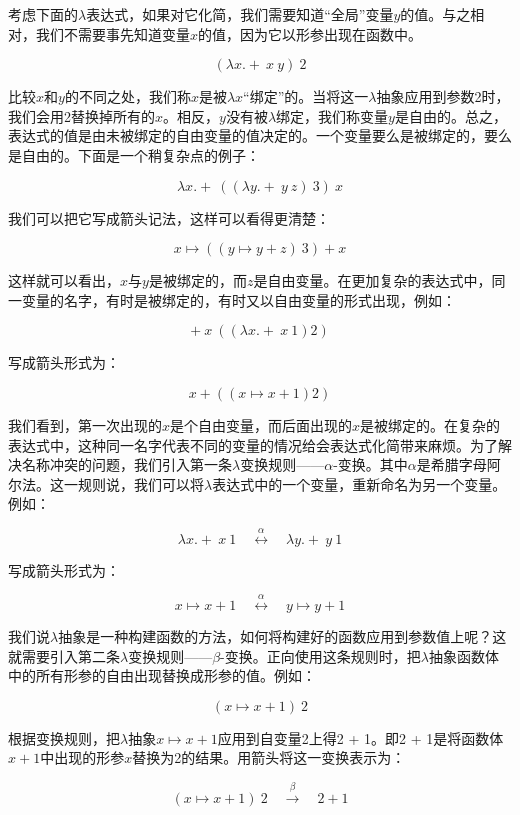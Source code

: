 \documentclass[UTF8]{article}
\begin{document}
考虑下面的$\lambda$表达式，如果对它化简，我们需要知道“全局”变量$y$的值。与之相对，我们不需要事先知道变量$x$的值，因为它以形参出现在函数中。

\[
(\lambda x . +\ x\ y)\ 2
\]

比较$x$和$y$的不同之处，我们称$x$是被$\lambda x$“绑定”的。当将这一$\lambda$抽象应用到参数2时，我们会用2替换掉所有的$x$。相反，$y$没有被$\lambda$绑定，我们称变量$y$是自由的。总之，表达式的值是由未被绑定的自由变量的值决定的。一个变量要么是被绑定的，要么是自由的。下面是一个稍复杂点的例子：

\[
\lambda x . +\ ((\lambda y . +\ y\ z)\ 3)\ x
\]

我们可以把它写成箭头记法，这样可以看得更清楚：

\[
x \mapsto ((y \mapsto y + z)\ 3) + x
\]

这样就可以看出，$x$与$y$是被绑定的，而$z$是自由变量。在更加复杂的表达式中，同一变量的名字，有时是被绑定的，有时又以自由变量的形式出现，例如：

\[
+\ x\ ((\lambda x . +\ x\ 1) 2)
\]

写成箭头形式为：

\[
x + ((x \mapsto x + 1) 2)
\]

我们看到，第一次出现的$x$是个自由变量，而后面出现的$x$是被绑定的。在复杂的表达式中，这种同一名字代表不同的变量的情况给会表达式化简带来麻烦。为了解决名称冲突的问题，我们引入第一条$\lambda$变换规则——$\alpha$-变换。其中$\alpha$是希腊字母阿尔法。这一规则说，我们可以将$\lambda$表达式中的一个变量，重新命名为另一个变量。例如：

\[
\lambda x . +\ x\ 1 \quad \overset{\alpha}{\longleftrightarrow} \quad \lambda y . +\ y\ 1
\]


写成箭头形式为：

\[
x \mapsto x + 1 \quad \overset{\alpha}{\longleftrightarrow} \quad y \mapsto y + 1
\]

我们说$\lambda$抽象是一种构建函数的方法，如何将构建好的函数应用到参数值上呢？这就需要引入第二条$\lambda$变换规则——$\beta$-变换。正向使用这条规则时，把$\lambda$抽象函数体中的所有形参的自由出现替换成形参的值。例如：

\[
(x \mapsto x + 1)\ 2
\]

根据变换规则，把$\lambda$抽象$x \mapsto x + 1$应用到自变量2上得2 + 1。即2 + 1是将函数体$x + 1$中出现的形参$x$替换为2的结果。用箭头将这一变换表示为：

\[
(x \mapsto x + 1)\ 2 \quad \overset{\beta}{\longrightarrow} \quad 2 + 1
\]
\end{document}
